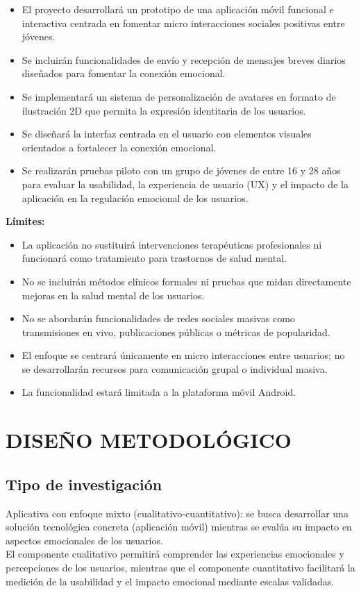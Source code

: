 \begin{itemize}[noitemsep, topsep=4pt, leftmargin=*]
    \item El proyecto desarrollará un prototipo de una aplicación móvil funcional e interactiva centrada en fomentar micro interacciones sociales positivas entre jóvenes.
    \item Se incluirán funcionalidades de envío y recepción de mensajes breves diarios diseñados para fomentar la conexión emocional.
    \item Se implementará un sistema de personalización de avatares en formato de ilustración 2D que permita la expresión identitaria de los usuarios.
    \item Se diseñará la interfaz centrada en el usuario con elementos visuales orientados a fortalecer la conexión emocional.
    \item Se realizarán pruebas piloto con un grupo de jóvenes de entre 16 y 28 años para evaluar la usabilidad, la experiencia de usuario (UX) y el impacto de la aplicación en la regulación emocional de los usuarios.
\end{itemize}

\noindent\textbf{Límites:}

\begin{itemize}[noitemsep, topsep=4pt, leftmargin=*]
    \item La aplicación no sustituirá intervenciones terapéuticas profesionales ni funcionará como tratamiento para trastornos de salud mental.
    \item No se incluirán métodos clínicos formales ni pruebas que midan directamente mejoras en la salud mental de los usuarios.
    \item No se abordarán funcionalidades de redes sociales masivas como transmisiones en vivo, publicaciones públicas o métricas de popularidad.
    \item El enfoque se centrará únicamente en micro interacciones entre usuarios; no se desarrollarán recursos para comunicación grupal o individual masiva.
    \item La funcionalidad estará limitada a la plataforma móvil Android.
\end{itemize}

\section{DISEÑO METODOLÓGICO}
\subsection{Tipo de investigación}
Aplicativa con enfoque mixto (cualitativo-cuantitativo): se busca desarrollar una solución tecnológica concreta (aplicación móvil) mientras se evalúa su impacto en aspectos emocionales de los usuarios.\\
El componente cualitativo permitirá comprender las experiencias emocionales y percepciones de los usuarios, mientras que el componente cuantitativo facilitará la medición de la usabilidad y el impacto emocional mediante escalas validadas.

